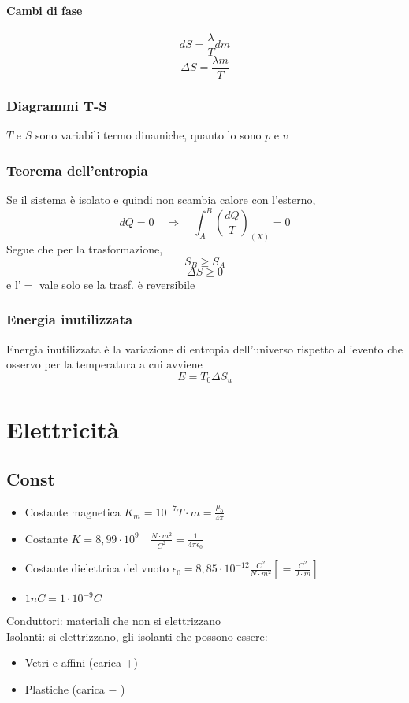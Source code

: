 \documentclass[a4paper]{report}
\begin{document}
  \subsubsection{Cambi di fase}
  $$ dS = \frac{\lambda}{T} dm$$
  $$ \Delta S = \frac{\lambda m}{T} $$

  \subsection{Diagrammi T-S}
  $T$ e $S$ sono variabili termo dinamiche, quanto lo sono $p$ e $v$

  \subsection{Teorema dell'entropia}
  Se il sistema è isolato e quindi non scambia calore con l'esterno,
  $$ dQ = 0 \quad \Rightarrow \quad \int_A^B(\frac{dQ}{T})_{(X)} = 0$$
  Segue che per la trasformazione,
  $$ S_B \geq S_A $$
  $$ \Delta S \geq 0 $$
  e l'$=$ vale solo se la trasf. è reversibile

  \subsection{Energia inutilizzata}
  Energia inutilizzata è la variazione di entropia dell'universo rispetto all'evento che osservo per la temperatura a cui avviene
  $$E = T_0 \Delta S_u$$


  \chapter{Elettricità}
  \section{Const}
  \begin{itemize}
    \item Costante magnetica $K_m = 10^{-7} T\cdot m = \frac{\mu_0}{4\pi}$
    \item Costante $K = 8,99 \cdot 10^9 \quad \frac{N\cdot m^2}{C^2} = \frac{1}{4\pi \epsilon_0}$
    \item Costante dielettrica del vuoto $\epsilon_0 = 8,85 \cdot 10^{-12} \frac{C^2}{N \cdot m^2} [= \frac{C^2}{J \cdot m}]$
    \item $1nC = 1 \cdot 10^{-9} C $
  \end{itemize}
  Conduttori: materiali che non si elettrizzano \\
  Isolanti: si elettrizzano, gli isolanti che possono essere:
  \begin{itemize}
    \item Vetri e affini (carica $+$)
    \item Plastiche (carica $-$ )
  \end{itemize}
\end{document}
